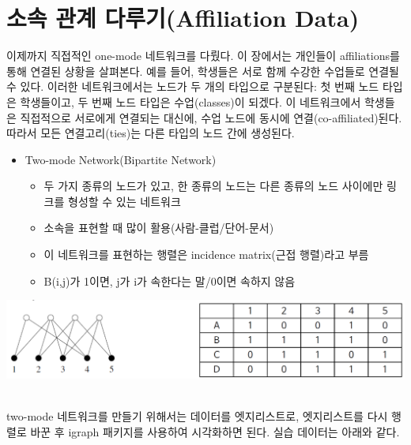 \documentclass[
]{book}
\begin{document}
\hypertarget{uxc18cuxc18d-uxad00uxacc4-uxb2e4uxb8e8uxae30affiliation-data}{%
\chapter{소속 관계 다루기(Affiliation Data)}\label{uxc18cuxc18d-uxad00uxacc4-uxb2e4uxb8e8uxae30affiliation-data}}

이제까지 직접적인 one-mode 네트워크를 다뤘다. 이 장에서는 개인들이 affiliations를 통해 연결된 상황을 살펴본다. 예를 들어, 학생들은 서로 함께 수강한 수업들로 연결될 수 있다. 이러한 네트워크에서는 노드가 두 개의 타입으로 구분된다: 첫 번째 노드 타입은 학생들이고, 두 번째 노드 타입은 수업(classes)이 되겠다. 이 네트워크에서 학생들은 직접적으로 서로에게 연결되는 대신에, 수업 노드에 동시에 연결(co-affiliated)된다. 따라서 모든 연결고리(ties)는 다른 타입의 노드 간에 생성된다.

\begin{itemize}
\item
  Two-mode Network(Bipartite Network)

  \begin{itemize}
  \item
    두 가지 종류의 노드가 있고, 한 종류의 노드는 다른 종류의 노드 사이에만 링크를 형성할 수 있는 네트워크
  \item
    소속을 표현할 때 많이 활용(사람-클럽/단어-문서)
  \item
    이 네트워크를 표현하는 행렬은 incidence matrix(근접 행렬)라고 부름
  \item
    B(i,j)가 1이면, j가 i가 속한다는 말/0이면 속하지 않음
  \end{itemize}
\end{itemize}

\begin{center}\includegraphics[width=0.8\linewidth]{images/twomode} \end{center}

\strut \\
two-mode 네트워크를 만들기 위해서는 데이터를 엣지리스트로, 엣지리스트를 다시 행렬로 바꾼 후 igraph 패키지를 사용하여 시각화하면 된다. 실습 데이터는 아래와 같다.
\end{document}
